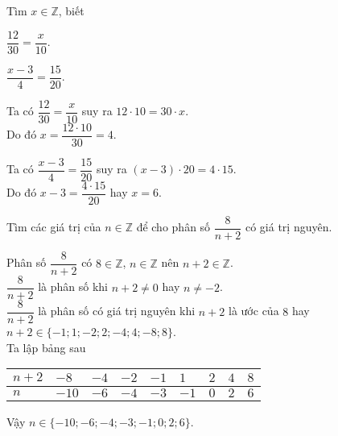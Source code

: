 \begin{bt}%
 Tìm $x\in \mathbb{Z}$, biết
 \begin{enumEX}{2}
  \item $\dfrac{12}{30}=\dfrac{x}{10}$.
  \item $\dfrac{x-3}{4}=\dfrac{15}{20}$.
 \end{enumEX}
 \loigiai
  {
  \begin{enumEX}{1}
   \item Ta có $\dfrac{12}{30}=\dfrac{x}{10}$ suy ra $12\cdot10 = 30\cdot x$.\\
   Do đó $x=\dfrac{12\cdot10}{30}=4$.
   \item Ta có $\dfrac{x-3}{4} = \dfrac{15}{20}$ suy ra $(x-3) \cdot 20 =4\cdot15$.\\
   Do đó $x-3=\dfrac{4\cdot15}{20}$ hay $x=6$.
  \end{enumEX}
  }
\end{bt}

\begin{bt}%
 Tìm các giá trị của $n\in\mathbb{Z}$ để cho phân số $\dfrac{8}{n+2}$ có giá trị nguyên.
 \loigiai
  {
  Phân số $\dfrac{8}{n+2}$ có $8\in\mathbb{Z}$, $n\in\mathbb{Z}$ nên $n+2\in\mathbb{Z}$.\\
  $\dfrac{8}{n+2}$ là phân số khi $n+2\neq 0$ hay $n\neq -2$.\\
  $\dfrac{8}{n+2}$ là phân số có giá trị nguyên khi $n+2$ là ước của $8$ hay $n+2 \in \{-1;1;-2;2;-4;4;-8;8\}$.\\
  Ta lập bảng sau
  \begin{center}
   \begin{tabular}{|>{\centering\arraybackslash}m{1cm}|>{\centering\arraybackslash}m{1cm}|>{\centering\arraybackslash}m{1cm}|>{\centering\arraybackslash}m{1cm}|>{\centering\arraybackslash}m{1cm}|>{\centering\arraybackslash}m{1cm}|>{\centering\arraybackslash}m{1cm}|>{\centering\arraybackslash}m{1cm}|>{\centering\arraybackslash}m{1cm}|}
  	\hline
  	$n+2$ & $-8$ & $-4$ & $-2$ & $-1$ & $1$ & $2$ & $4$ & $8$ \\ \hline
  	$n$ & $-10$ & $-6$ & $-4$ & $-3$ & $-1$ & $0$ & $2$ & $6$\\ \hline
   \end{tabular}
  \end{center}
  Vậy $n\in\{-10;-6;-4;-3;-1;0;2;6\}$.
  }
\end{bt}

